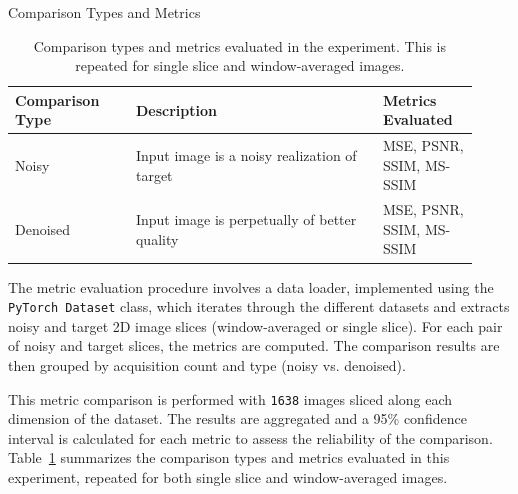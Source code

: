 \begin{table}[h]
    \centering
    \caption{Comparison Types and Metrics}
    \begin{tabular}{p{0.24\linewidth} | p{0.49\linewidth} | p{0.19\linewidth}}
        \hline
        \textbf{Comparison Type} & \textbf{Description} & \textbf{Metrics Evaluated} \\
        \hline
        Noisy & Input image is a noisy realization of target & MSE, PSNR, SSIM, MS-SSIM \\
        \hline
        Denoised & Input image is perpetually of better quality & MSE, PSNR, SSIM, MS-SSIM \\
        \hline
    \end{tabular}
    \caption{Comparison types and metrics evaluated in the experiment. This is repeated for single slice and window-averaged images.}
    \label{tab:comparison_types}
\end{table}

The metric evaluation procedure involves a data loader, implemented using the \texttt{PyTorch Dataset} class, which iterates through the different datasets and extracts noisy and target 2D image slices (window-averaged or single slice). For each pair of noisy and target slices, the metrics are computed. The comparison results are then grouped by acquisition count and type (noisy vs. denoised).

This metric comparison is performed with \texttt{1638} images sliced along each dimension of the dataset. The results are aggregated and a 95\% confidence interval is calculated for each metric to assess the reliability of the comparison. Table~\ref{tab:comparison_types} summarizes the comparison types and metrics evaluated in this experiment, repeated for both single slice and window-averaged images.


